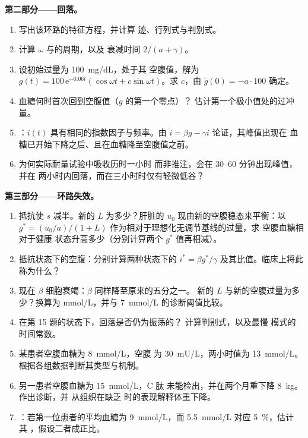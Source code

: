 \begin{problem}
\medskip
\noindent\textbf{第二部分——回落。}
\begin{enumerate}[resume]
  \item 写出该环路的特征方程，并计算
        迹、行列式与判别式。
  \item 计算 $\omega$ 与的周期，以及
        衰减时间 $2/(a + \gamma)$。
  \item 设初始过量为 \qty{100}{mg/dL}，处于其
        空腹值，解为 $g(t) = 100\,\mathrm{e}^{-0.06t}
        (\cos\omega t + c\sin\omega t)$。求 $c$，由 $\dot g(0) = -a\cdot
        100$ 确定。
  \item 血糖何时首次回到空腹值（$g$ 的第一个零点）？
        估计第一个极小值处的过冲量。
  \item {}：$i(t)$ 具有相同的指数因子与频率。由
        $\dot i = \beta g - \gamma i$ 论证，其峰值出现在
        血糖已开始下降之后、且在血糖降至空腹值之前。
  \item 为何实际耐量试验中吸收历时一小时
        而非推注，会在 30--60 分钟出现峰值，并在
        两小时内回落，而在三小时时仅有轻微低谷？
\end{enumerate}

\medskip
\noindent\textbf{第三部分——环路失效。}
\begin{enumerate}[resume]
  \item {}抵抗使 $s$ 减半。新的 $L$ 为多少？肝脏的 $u_{0}$
        现由新的空腹稳态来平衡：以 $g^{*} = (u_{0}/a)/(1
        + L)$ 作为相对于理想化无调节基线的过量，求
        空腹血糖相对于健康
        状态升高多少（分别计算两个 $g^{*}$ 值再相减）。
  \item {}抵抗状态下的空腹：分别计算两种状态下的 $i^{*} = \beta
        g^{*}/\gamma$ 及其比值。临床上将此
        称为什么？
  \item 现在 $\beta$ 细胞衰竭：$\beta$ 同样降至原来的五分之一。
        新的 $L$ 与新的空腹过量为多少？换算为 mmol/L，并与
        \qty{7}{mmol/L} 的诊断阈值比较。
  \item 在第 15 题的状态下，回落是否仍为振荡的？
        计算判别式，以及最慢
        模式的时间常数。
  \item 某患者空腹血糖为 \qty{8}{mmol/L}，空腹
        为 \qty{30}{mU/L}，两小时值为 \qty{13}{mmol/L}。
        根据各组数据判断其类型与机制。
  \item 另一患者空腹血糖为 \qty{15}{mmol/L}，C 肽
        未能检出，并在两个月重下降 \qty{8}{kg}。作出诊断，并
        从组织在缺乏
        时的表现解释体重下降。
  \item {}：若第一位患者的平均血糖为
        \qty{9}{mmol/L}，而 \qty{5.5}{mmol/L} 对应 \qty{5}{\%}，估计
        其 ，假设二者成正比。
\end{enumerate}


\end{problem}
